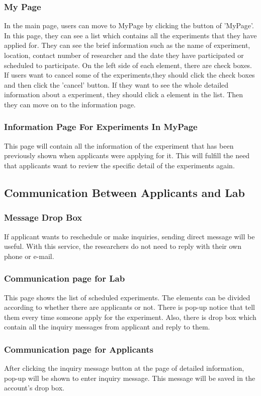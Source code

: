 \documentclass[letterpaper, 10 pt, conference]{ieeeconf}  %
\begin{document}
\subsubsection{My Page}
In the main page, users can move to MyPage by clicking the button of 'MyPage'. In this page, they can see a list which contains all the experiments that they have applied for. They can see the brief information such as the name of experiment, location, contact number of researcher and the date they have participated or scheduled to participate. On the left side of each element, there are check boxes. If users want to cancel some of the experiments,they should click the check boxes and then click the 'cancel' button. If they want to see the whole detailed information about a experiment, they should click a element in the list. Then they can move on to the information page.
\subsubsection{Information Page For Experiments In MyPage}
This page will contain all the information of the experiment that has been previously shown when applicants were applying for it. This will fulfill the need that applicants want to review the specific detail of the experiments again.


\subsection{Communication Between Applicants and Lab}
\subsubsection{Message Drop Box}
If applicant wants to reschedule or make inquiries, sending direct message will be useful. With this service, the researchers do not need to reply with their own phone or e-mail. 
\subsubsection{Communication page for Lab}
This page shows the list of scheduled experiments. The elements can be divided according to whether there are applicants or not. There is pop-up notice that tell them every time someone apply for the experiment. Also, there is drop box which contain all the inquiry messages from applicant and reply to them. 
\subsubsection{Communication page for Applicants}
After clicking the inquiry message button at the page of detailed information, pop-up will be shown to enter inquiry message. This message will be saved in the account's drop box. 
\end{document}

